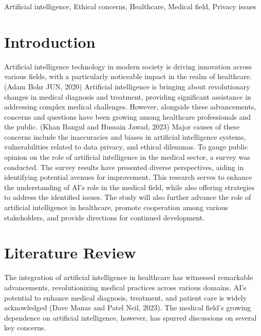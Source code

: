 \documentclass{ieeeaccess}
\begin{document}
\begin{keywords}
Artificial intelligence, Ethical concerns, Healthcare, Medical field, Privacy issues
\end{keywords}

\titlepgskip=-21pt

\maketitle

\section{Introduction}
\label{sec:introduction}
Artificial intelligence technology in modern society is driving innovation across various fields, with a particularly noticeable impact in the realm of healthcare. (Adam Bohr JUN, 2020) Artificial intelligence is bringing about revolutionary changes in medical diagnosis and treatment, providing significant assistance in addressing complex medical challenges. However, alongside these advancements, concerns and questions have been growing among healthcare professionals and the public. (Khan Bangul and Hussain Jawad, 2023) Major causes of these concerns include the inaccuracies and biases in artificial intelligence systems, vulnerabilities related to data privacy, and ethical dilemmas. To gauge public opinion on the role of artificial intelligence in the medical sector, a survey was conducted. The survey results have presented diverse perspectives, aiding in identifying potential avenues for improvement. This research serves to enhance the understanding of AI's role in the medical field, while also offering strategies to address the identified issues. The study will also further advance the role of artificial intelligence in healthcare, promote cooperation among various stakeholders, and provide directions for continued development.

\section{Literature Review}
The integration of artificial intelligence in healthcare has witnessed remarkable advancements, revolutionizing medical practices across various domains. AI's potential to enhance medical diagnosis, treatment, and patient care is widely acknowledged (Dave Manas and Patel Neil, 2023). The medical field's growing dependence on artificial intelligence, however, has spurred discussions on several key concerns.
\end{document}
